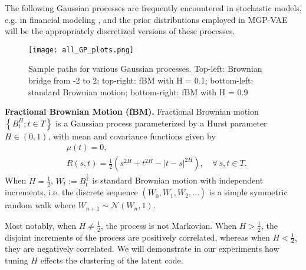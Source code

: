\documentclass[runningheads]{llncs}
\newcommand{\abs}[1]{\left\lvert#1\right\rvert}
\begin{document}
   The following Gaussian processes are frequently encountered in stochastic models, e.g. in financial modeling \cite{bfg2016,glasserman}, and the prior distributions employed in MGP-VAE will be the appropriately discretized versions of these processes.

    \begin{figure}
   \centering  
   \texttt{[image: all\_GP\_plots.png]}
   \caption{Sample paths for various Gaussian processes. Top-left: Brownian bridge from -2 to 2; top-right: fBM with H = 0.1; bottom-left: standard Brownian motion; bottom-right: fBM with H = 0.9}
   \end{figure}

\noindent \textbf{Fractional Brownian Motion (fBM). }
   Fractional Brownian motion \cite{fBMMandelbrot} $\left\{ B^H_t; t\in T \right\}$ is a Gaussian process parameterized by a Hurst parameter $H \in (0, 1)$, with mean and covariance functions given by
   \begin{align} \label{fbmParam}
   &\mu(t) = 0, \\
   &R(s, t) = \frac{1}{2} \left(s^{2H} + t^{2H} - \abs{t - s}^{2H} \right), \quad \forall \, s, t \in T.
   \end{align}
   When $H = \frac{1}{2}$, $W_t := B^{\frac{1}{2}}_t$ is standard Brownian motion \cite{hidaGP} with independent increments, i.e. the discrete sequence $(W^{\frac{}{}}_0, W_1, W_2, \ldots)$ is a simple symmetric random walk where $W_{n+1} \sim \mathcal{N} (W_n, 1)$. \par 
   Most notably, when $H \neq \frac{1}{2}$, the process is not Markovian. When $H > \frac{1}{2}$, the disjoint increments of the process are positively correlated, whereas when $H < \frac{1}{2}$, they are negatively correlated. We will demonstrate in our experiments how tuning $H$ effects the clustering of the latent code. \par
   
\end{document}
